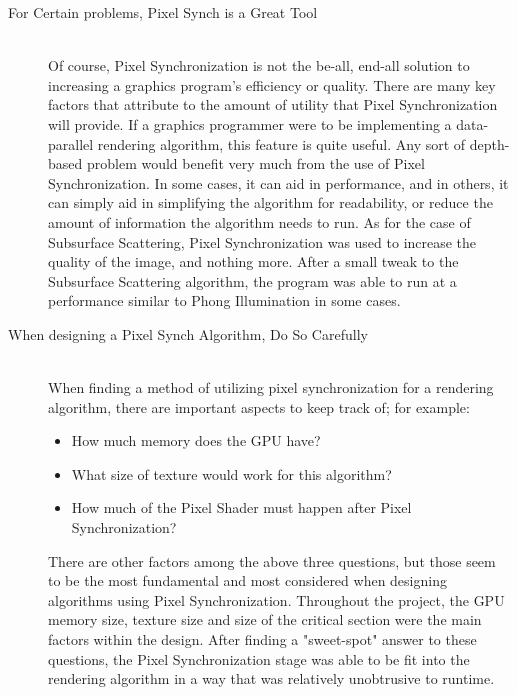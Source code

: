 \documentclass[a4paper, 12pt]{article}
\begin{document}
\begin{description}

\item[For Certain problems, Pixel Synch is a Great Tool] \hfill \\

Of course, Pixel Synchronization is not the be-all, end-all solution to
increasing a graphics program's efficiency or quality. There are many key
factors that attribute to the amount of utility that Pixel Synchronization
will provide. If a graphics programmer were to be implementing a data-parallel
rendering algorithm, this feature is quite useful. Any sort of depth-based
problem would benefit very much from the use of Pixel Synchronization. In some
cases, it can aid in performance, and in others, it can simply aid in
simplifying the algorithm for readability, or reduce the amount of information
the algorithm needs to run. As for the case of Subsurface Scattering, Pixel
Synchronization was used to increase the quality of the image, and nothing
more. After a small tweak to the Subsurface Scattering algorithm, the program
was able to run at a performance similar to Phong Illumination in some cases.

\item[When designing a Pixel Synch Algorithm, Do So Carefully] \hfill \\

When finding a method of utilizing pixel synchronization for a rendering
algorithm, there are important aspects to keep track of; for example:

\begin{itemize} 

\item How much memory does the GPU have?
\item What size of texture would work for this algorithm?
\item How much of the Pixel Shader must happen after Pixel Synchronization?

\end{itemize}

There are other factors among the above three questions, but those seem to be
the most fundamental and most considered when designing algorithms using Pixel
Synchronization. Throughout the project, the GPU memory size, texture size and
size of the critical section were the main factors within the design. After
finding a "sweet-spot" answer to these questions, the Pixel Synchronization
stage was able to be fit into the rendering algorithm in a way that was
relatively unobtrusive to runtime.


\end{description}
\end{document}
